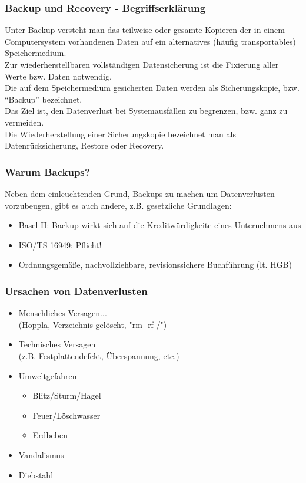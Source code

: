 \begin{frame}
  \frametitle{Backup und Recovery - Begriffserklärung}
  \pause
  Unter Backup versteht man das teilweise oder gesamte Kopieren der in einem Computersystem vorhandenen Daten auf ein alternatives (häufig transportables) Speichermedium.\\ \pause
  Zur wiederherstellbaren vollständigen Datensicherung ist die Fixierung aller Werte bzw. Daten notwendig.\\ \pause
  Die auf dem Speichermedium gesicherten Daten werden als Sicherungskopie, bzw. “Backup” bezeichnet.\\ \pause
  Das Ziel ist, den Datenverlust bei Systemausfällen zu begrenzen, bzw. ganz zu vermeiden.\\ \pause
  Die Wiederherstellung einer Sicherungskopie bezeichnet man als Datenrücksicherung, Restore oder Recovery.
\end{frame}

\begin{frame}
  \frametitle{Warum Backups?}
  \pause
  Neben dem einleuchtenden Grund, Backups zu machen um Datenverlusten vorzubeugen, gibt es auch andere, z.B. gesetzliche Grundlagen:\\ \pause
  \begin{itemize}
    \item Basel II: Backup wirkt sich auf die Kreditwürdigkeite eines Unternehmens aus
    \item ISO/TS 16949: Pflicht!
    \item Ordnungsgemäße, nachvollziehbare, revisionssichere Buchführung (lt. HGB)
  \end{itemize}
\end{frame}

\begin{frame}
  \frametitle{Ursachen von Datenverlusten}
  \pause
  \begin{itemize}
    \item Menschliches Versagen...\\(Hoppla, Verzeichnis gelöscht, "rm -rf /")
    \item Technisches Versagen\\(z.B. Festplattendefekt, Überspannung, etc.)
    \item Umweltgefahren
    \begin{itemize}
      \item Blitz/Sturm/Hagel
      \item Feuer/Löschwasser
      \item Erdbeben
    \end{itemize}
    \item Vandalismus
    \item Diebstahl
  \end{itemize}
\end{frame}

